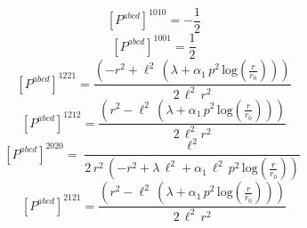 \documentclass[11pt]{article}
\begin{document}
\begin{dmath*}[breakdepth={5}]
\left[P^{abcd}\right]^{1010} = -\frac{1}{2}
\end{dmath*}
\begin{dmath*}[breakdepth={5}]
\left[P^{abcd}\right]^{1001} = \frac{1}{2}
\end{dmath*}
\begin{dmath*}[breakdepth={5}]
\left[P^{abcd}\right]^{1221} = \frac{\left(-{r}^{2} + {\ell}^{2}\,\left(\lambda + \alpha_{1}\,{p}^{2}\,\mathrm{log}\!\left(\frac{r}{r_{0}}\right)\right)\right)}{2\,{\ell}^{2}\,{r}^{2}}
\end{dmath*}
\begin{dmath*}[breakdepth={5}]
\left[P^{abcd}\right]^{1212} = \frac{\left({r}^{2} - {\ell}^{2}\,\left(\lambda + \alpha_{1}\,{p}^{2}\,\mathrm{log}\!\left(\frac{r}{r_{0}}\right)\right)\right)}{2\,{\ell}^{2}\,{r}^{2}}
\end{dmath*}
\begin{dmath*}[breakdepth={5}]
\left[P^{abcd}\right]^{2020} = \frac{{\ell}^{2}}{2\,{r}^{2}\,\left(-{r}^{2} + \lambda\,{\ell}^{2} + \alpha_{1}\,{\ell}^{2}\,{p}^{2}\,\mathrm{log}\!\left(\frac{r}{r_{0}}\right)\right)}
\end{dmath*}
\begin{dmath*}[breakdepth={5}]
\left[P^{abcd}\right]^{2121} = \frac{\left({r}^{2} - {\ell}^{2}\,\left(\lambda + \alpha_{1}\,{p}^{2}\,\mathrm{log}\!\left(\frac{r}{r_{0}}\right)\right)\right)}{2\,{\ell}^{2}\,{r}^{2}}
\end{dmath*}
\end{document}
